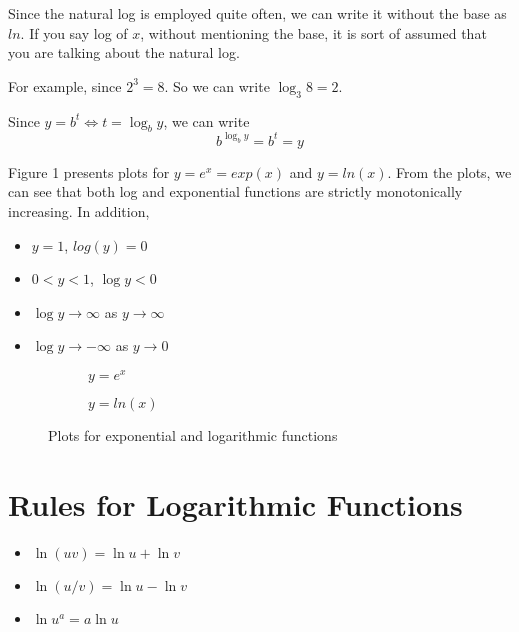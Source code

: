\documentclass{./../Latex/handout}
\begin{document}
Since the natural log is employed quite often, we can write it without the base as $ln$. If you say log of $x$, without mentioning the base, it is sort of assumed that you are talking about the natural log. 

For example, since $2^{3}=8$. So we can write $\log _{3} 8=2$. 

Since $y=b^{t} \Longleftrightarrow t=\log _{b} y$, we can write
$$
b^{\log _{b} y}=b^{t}=y
$$

Figure 1 presents plots for $y = e^x = exp(x)$ and $y=ln(x)$. From the plots, we can see that both log and exponential functions are strictly monotonically increasing. In addition,
\begin{itemize}
	\item $y=1$, $log(y) = 0$
	\item $0<y<1$,  $\log y<0$
	\item $\log y \rightarrow \infty$ as $y \rightarrow \infty$
	\item $\log y \rightarrow-\infty$ as $y \rightarrow 0$
\end{itemize}


\pgfplotsset{%
    width=8cm,
    height=7cm
}
\begin{figure*}[t]
\begin{subfigure}[b]{0.5\textwidth}
\caption{$y = e^x$}
\end{subfigure}
\begin{subfigure}[b]{0.5\textwidth}
\caption{$y =ln(x)$}
\end{subfigure}
\caption{Plots for exponential and logarithmic functions}
\end{figure*}


\section{Rules for Logarithmic Functions}
\begin{itemize}
	\item $\ln (u v)=\ln u+\ln v$ 
	\item $\ln (u / v)=\ln u-\ln v$
	\item $\ln u^{a}=a \ln u$
\end{itemize}
\end{document}
